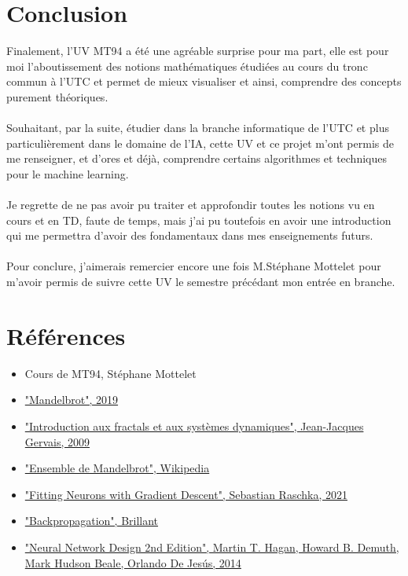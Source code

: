    \section*{Conclusion}
      Finalement, l'UV MT94 a été une agréable surprise pour ma part, elle est pour moi l'aboutissement des notions mathématiques étudiées au cours du tronc commun à l'UTC et permet de mieux visualiser et ainsi, comprendre des concepts purement théoriques.\\\\Souhaitant, par la suite, étudier dans la branche informatique de l'UTC et plus particulièrement dans le domaine de l'IA, cette UV et ce projet m'ont permis de me renseigner, et d'ores et déjà, comprendre certains algorithmes et techniques pour le machine learning. \\\\Je regrette de ne pas avoir pu traiter et approfondir toutes les notions vu en cours et en TD, faute de temps, mais j'ai pu toutefois en avoir une introduction qui me permettra d'avoir des fondamentaux dans mes enseignements futurs.\\\\
      Pour conclure, j'aimerais remercier encore une fois M.Stéphane Mottelet pour m'avoir permis de suivre cette UV le semestre précédant mon entrée en branche.
   
   \newpage
    \section*{Références}
    \begin{itemize}
        \item Cours de MT94, Stéphane Mottelet
        \item \href{https://mpsib-camille-guerin.pagesperso-orange.fr/Python/Mandelbrot/Mandelbrot.pdf}{"Mandelbrot", 2019}
        \item \href{https://www2.mat.ulaval.ca/fileadmin/Cours/MAT-2430/Notes_de_cours/NotesDeCours.pdf}{"Introduction aux fractals
et aux systèmes dynamiques", Jean-Jacques Gervais, 2009}
        \item \href{https://fr.wikipedia.org/wiki/Ensemble_de_Mandelbrot}{"Ensemble de Mandelbrot", Wikipedia}
        \item \href{https://sebastianraschka.com/pdf/lecture-notes/stat453ss21/L05_gradient-descent_slides.pdf}{"Fitting Neurons with
Gradient Descent", Sebastian Raschka, 2021}
        \item \href{https://brilliant.org/wiki/backpropagation/}{"Backpropagation", Brillant}
        \item \href{https://hagan.okstate.edu/NNDesign.pdf}{"Neural Network Design 2nd Edition", Martin T. Hagan, Howard B. Demuth, Mark Hudson Beale, Orlando De Jesús, 2014}
    \end{itemize}









